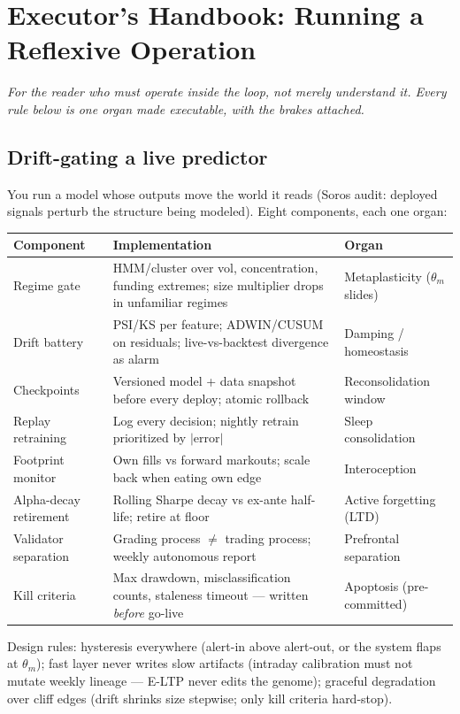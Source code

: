 \chapter{Executor's Handbook: Running a Reflexive Operation}

\textit{For the reader who must operate inside the loop, not merely understand it. Every rule below is one organ made executable, with the brakes attached.}

\section{Drift-gating a live predictor}

You run a model whose outputs move the world it reads (Soros audit: deployed signals perturb the structure being modeled). Eight components, each one organ:

\begin{center}
\small
\begin{tabular}{p{2.6cm}p{4.4cm}p{4.6cm}}
\toprule
Component & Implementation & Organ \\
\midrule
Regime gate & HMM/cluster over vol, concentration, funding extremes; size multiplier drops in unfamiliar regimes & Metaplasticity ($\theta_m$ slides) \\
Drift battery & PSI/KS per feature; ADWIN/CUSUM on residuals; live-vs-backtest divergence as alarm & Damping / homeostasis \\
Checkpoints & Versioned model + data snapshot before every deploy; atomic rollback & Reconsolidation window \\
Replay retraining & Log every decision; nightly retrain prioritized by $|$error$|$ & Sleep consolidation \\
Footprint monitor & Own fills vs forward markouts; scale back when eating own edge & Interoception \\
Alpha-decay retirement & Rolling Sharpe decay vs ex-ante half-life; retire at floor & Active forgetting (LTD) \\
Validator separation & Grading process $\neq$ trading process; weekly autonomous report & Prefrontal separation \\
Kill criteria & Max drawdown, misclassification counts, staleness timeout --- written \textit{before} go-live & Apoptosis (pre-committed) \\
\bottomrule
\end{tabular}
\end{center}

Design rules: hysteresis everywhere (alert-in above alert-out, or the system flaps at $\theta_m$); fast layer never writes slow artifacts (intraday calibration must not mutate weekly lineage --- E-LTP never edits the genome); graceful degradation over cliff edges (drift shrinks size stepwise; only kill criteria hard-stop).

